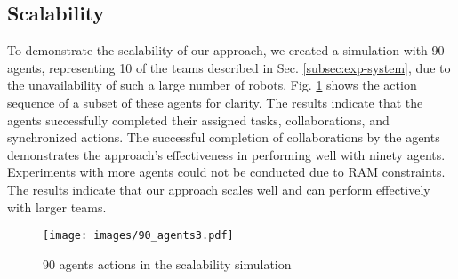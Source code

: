 \subsection{Scalability}
\label{subsec:exp-scalability}
To demonstrate the scalability of our approach, we created a simulation with 90 agents, representing 10 of the teams described in Sec. \ref{subsec:exp-system}, due to the unavailability of such a large number of robots. Fig. \ref{fig:scalability} shows the action sequence of a subset of these agents for clarity. The results indicate that the agents successfully completed their assigned tasks, collaborations, and synchronized actions. The successful completion of collaborations by the agents demonstrates the approach's effectiveness in performing well with ninety agents. Experiments with more agents could not be conducted due to RAM constraints. The results indicate that our approach scales well and can perform effectively with larger teams.
\begin{figure}[ht]
    \centering
    \texttt{[image: images/90\_agents3.pdf]}
    \caption{90 agents actions in the scalability simulation}
    \label{fig:scalability}
\end{figure}
